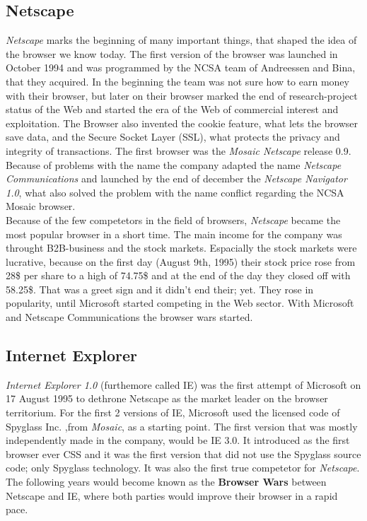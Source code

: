 \documentclass[runningheads]{llncs}
\begin{document}
		\subsection{Netscape}
		\textit{Netscape} marks the beginning of many important things, that shaped the idea of the browser we know today. The first version of the browser was launched in October 1994 and was programmed by the NCSA team of Andreessen and Bina, that they acquired. In the beginning the team was not sure how to earn money with their browser, but later on their browser marked the end of research-project status of the Web and started the era of the Web of commercial interest and exploitation. The Browser also invented the cookie feature, what lets the browser save data, and the Secure Socket Layer (SSL), what protects the privacy  and integrity of transactions. The first browser was the \textit{Mosaic Netscape} release 0.9. Because of problems with the name the company adapted the name \textit{Netscape Communications} and launched by the end of december the \textit{Netscape Navigator 1.0}, what also solved the problem with the name conflict regarding the NCSA Mosaic browser.
		\\Because of the few competetors in the field of browsers, \textit{Netscape} became the most popular browser in a short time. The main income for the company was throught B2B-business and the stock markets. Espacially the stock markets were lucrative, because on the first day (August 9th, 1995) their stock price rose from 28\$ per share to a high of 74.75\$ and at the end of the day they closed off with 58.25\$. That was a greet sign and it didn't end their; yet. They rose in popularity, until Microsoft started competing in the Web sector. With Microsoft and Netscape Communications the browser wars started.
		\subsection{Internet Explorer}
		\textit{Internet Explorer 1.0} (furthemore called IE) was the first attempt of Microsoft on 17 August 1995 to dethrone Netscape as the market leader on the browser territorium. For the first 2 versions of IE, Microsoft used the licensed code of Spyglass Inc. ,from \textit{Mosaic}, as a starting point. The first version that was mostly independently made in the company, would be IE 3.0. It introduced as the first browser ever CSS and it was the first version that did not use the Spyglass source code; only Spyglass technology. It was also the first true competetor for \textit{Netscape}. The following years would become known as the \textbf{Browser Wars} between Netscape and IE, where both parties would improve their browser in a rapid pace.
\end{document}
